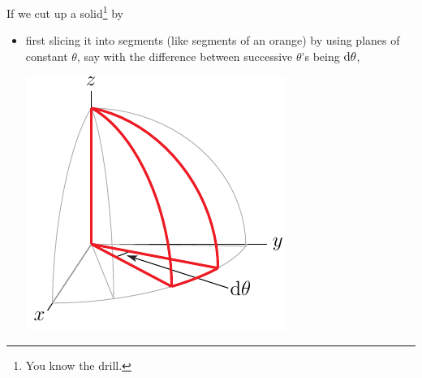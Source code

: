 If we cut up a solid\footnote{You know the drill.} by
\begin{itemize}
\item
first slicing it into segments (like segments of an orange) by 
using planes of constant $\theta$, say with the difference between 
successive $\theta$'s being $\mathrm{d}\theta$,
\begin{efig}
\begin{center}
    \includegraphics{sphereSph1.pdf}
\end{center}
\end{efig}


\end{itemize}
